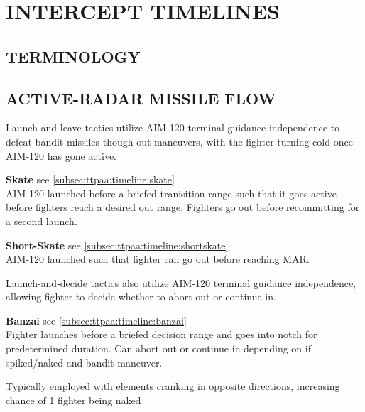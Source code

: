 \section{INTERCEPT TIMELINES}
\label{sec:ttp_aa:timelines}

\subsection{TERMINOLOGY}

\begin{tcoloritemize}
    \blueitem[Contact]
    \blueitem[Group]
    \blueitem[Picture]
\end{tcoloritemize}

\subsection[AR FLOW]{ACTIVE-RADAR MISSILE FLOW}

\begin{tcoloritemize}
    Launch-and-leave tactics utilize AIM-120 terminal guidance independence 
    to defeat bandit missiles though out maneuvers, 
    with the fighter turning cold once AIM-120 has gone active.

    \bigskip
    \textbf{Skate} \hfill see \cref{subsec:ttpaa:timeline:skate}\\
    AIM-120 launched before a briefed tranisition range 
    such that it goes active before fighters reach a desired out range.
    Fighters go out before recommitting for a second launch.
    
    \bigskip
    \textbf{Short-Skate} \hfill see \cref{subsec:ttpaa:timeline:shortskate}\\
    AIM-120 launched such that fighter can go out before reaching MAR.

    Launch-and-decide tactics also utilize AIM-120 terminal guidance independence, 
    allowing fighter to decide whether to abort out or continue in.

    \bigskip
    \textbf{Banzai} \hfill see \cref{subsec:ttpaa:timeline:banzai}\\
    Fighter launches before a briefed decision range and goes into notch for predetermined duration. 
    Can abort out or continue in depending on if spiked/naked and bandit maneuver.

    Typically employed with elements cranking in opposite directions, increasing chance of 1 fighter being naked
\end{tcoloritemize}


